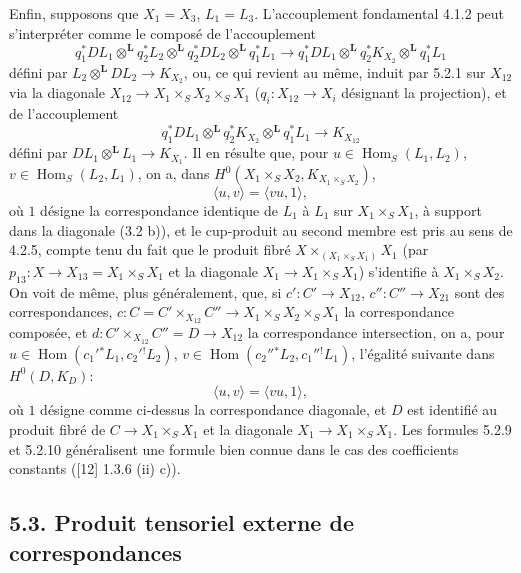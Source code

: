 \documentclass[11pt]{article}
\DeclareMathOperator{\Hom}{Hom}
\providecommand{\Hom}{\operatorname{Hom}}
\providecommand{\Hom}{\operatorname{Hom}}
\begin{document}
Enfin, supposons que $X_1=X_3$, $L_1=L_3$. L'accouplement fondamental 4.1.2 peut s'interpréter comme le composé de l'accouplement
\begin{equation}
\tag{5.2.7}
q_1^*DL_1\otimes^{\mathbf L}q_2^*L_2\otimes^{\mathbf L}q_2^*DL_2\otimes^{\mathbf L}q_1^*L_1
\longrightarrow
q_1^*DL_1\otimes^{\mathbf L}q_2^*K_{X_2}\otimes^{\mathbf L}q_1^*L_1
\end{equation}
défini par $L_2\otimes^{\mathbf L}DL_2\to K_{X_2}$, ou, ce qui revient au même, induit par 5.2.1 sur $X_{12}$ via la diagonale $X_{12}\to X_1\times_SX_2\times_SX_1$ ($q_i:X_{12}\to X_i$ désignant la projection), et de l'accouplement
\begin{equation}
\tag{5.2.8}
q_1^*DL_1\otimes^{\mathbf L}q_2^*K_{X_2}\otimes^{\mathbf L}q_1^*L_1\longrightarrow K_{X_{12}}
\end{equation}
défini par $DL_1\otimes^{\mathbf L}L_1\to K_{X_1}$. Il en résulte que, pour $u\in\Hom_S(L_1,L_2)$, $v\in\Hom_S(L_2,L_1)$, on a, dans $H^0(X_1\times_SX_2,K_{X_1\times_SX_2})$,
\begin{equation}
\tag{5.2.9}
\langle u,v\rangle=\langle vu,1\rangle,
\end{equation}
où $1$ désigne la correspondance identique de $L_1$ à $L_1$ sur $X_1\times_SX_1$, à support dans la diagonale (3.2 b)), et le cup-produit au second membre est pris au sens de 4.2.5, compte tenu du fait que le produit fibré $X\times_{(X_1\times_SX_1)}X_1$ (par $p_{13}:X\to X_{13}=X_1\times_SX_1$ et la diagonale $X_1\to X_1\times_SX_1$) s'identifie à $X_1\times_SX_2$. On voit de même, plus généralement, que, si $c':C'\to X_{12}$, $c'':C''\to X_{21}$ sont des correspondances, $c:C=C'\times_{X_{12}}C''\to X_1\times_SX_2\times_SX_1$ la correspondance composée, et $d:C'\times_{X_{12}}C''=D\to X_{12}$ la correspondance intersection, on a, pour $u\in\Hom(c_1'{}^*L_1,c_2'{}^!L_2)$, $v\in\Hom(c_2''{}^*L_2,c_1''{}^!L_1)$, l'égalité suivante dans $H^0(D,K_D)$:
\begin{equation}
\tag{5.2.10}
\langle u,v\rangle=\langle vu,1\rangle,
\end{equation}
où $1$ désigne comme ci-dessus la correspondance diagonale, et $D$ est identifié au produit fibré de $C\to X_1\times_SX_1$ et la diagonale $X_1\to X_1\times_SX_1$. Les formules 5.2.9 et 5.2.10 généralisent une formule bien connue dans le cas des coefficients constants ([12] 1.3.6 (ii) c)).

\subsection*{5.3. Produit tensoriel externe de correspondances}
\end{document}
